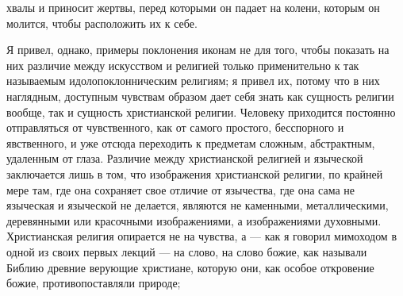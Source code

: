\documentclass[12pt]{article}
\begin{document}
хвалы и приносит жертвы, перед которыми он падает на колени, которым он молится, чтобы расположить их к себе. 

Я привел, однако, примеры поклонения иконам не для того, чтобы показать на них различие между искусством и религией только применительно к так называемым идолопоклонническим религиям; я привел их, потому что в них наглядным, доступным чувствам образом дает себя знать как сущность религии вообще, так и сущность христианской религии. Человеку приходится постоянно отправляться от чувственного, как от самого простого, бесспорного и явственного, и уже отсюда переходить к предметам сложным, абстрактным, удаленным от глаза. Различие между христианской религией и языческой заключается лишь в том, что изображения христианской религии, по крайней мере там, где она сохраняет свое отличие от язычества, где она сама не языческая и языческой не делается, являются не каменными, металлическими, деревянными или красочными изображениями, а изображениями духовными. Христианская религия опирается не на чувства, а --- как я говорил мимоходом в одной из своих первых лекций --- на слово, на слово божие, как называли Библию древние верующие христиане, которую они, как особое откровение божие, противопоставляли природе; 
\end{document}
